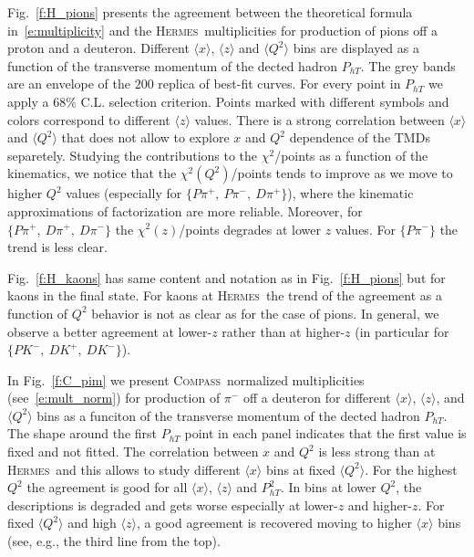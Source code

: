 \documentclass[aps,preprintnumbers,showpacs,nofootinbib,superscriptaddress,floatfix]{revtex4}
\newcommand{\AS}[1]{{\textcolor[rgb]{1,0,1}{#1}}}
\newcommand{\hermes}{\textsc{Hermes}}
\newcommand{\compass}{\textsc{Compass}}
\begin{document}

Fig.~\ref{f:H_pions} presents the agreement between the theoretical formula in~\eqref{e:multiplicity} and the \hermes\ multiplicities for production of pions off a proton and a deuteron. 
Different $\langle x \rangle$, $\langle z \rangle$ and $\langle Q^2 \rangle$ bins are displayed as a \AS{function} of the transverse momentum of the dected hadron $P_{hT}$.
The grey bands are an envelope of the $200$ replica of best-fit curves. For every point in $P_{hT}$ we apply a $68\%$ C.L. selection criterion. 
Points marked with different symbols and colors correspond to different $\langle z \rangle$ values. There is a strong correlation between $\langle x \rangle$ and $\langle Q^2 \rangle$ that does not allow to explore $x$ and $Q^2$ dependence of the TMDs separetely. 
\AS{Studying the contributions to the $\chi^2$/points as a function of the kinematics,  
we notice that the $\chi^2(Q^2)$/points tends to improve as we move to higher $Q^2$ values (especially for $\{ P \pi^+,\ P \pi^-,\ D \pi^+  \}$), where the kinematic approximations of factorization are more reliable. 
Moreover, for $\{ P \pi^+,\ D \pi^+,\ D \pi^-  \}$ the $\chi^2(z)$/points degrades at lower $z$ values. For $\{ P \pi^- \}$ the trend is less clear. }

Fig.~\ref{f:H_kaons} has same content and notation as in Fig.~\ref{f:H_pions} but for kaons in the final state. %
\AS{For kaons at \hermes\ the trend of the agreement as a function of $Q^2$ behavior is not as clear as for the case of pions. 
In general, we observe a better agreement at lower-$z$ rather than at higher-$z$ (in particular for $\{ P K^-,\ D K^+,\ D K^- \}$). }

In Fig.~\ref{f:C_pim} we present \compass\ normalized multiplicities (see~\eqref{e:mult_norm}) for production of $\pi^-$ off a deuteron for different $\langle x \rangle$, $\langle z \rangle$, and $\langle Q^2 \rangle$ bins as a funciton of the transverse momentum of the dected hadron $P_{hT}$. The \AS{shape} around the first $P_{hT}$ point in each panel indicates that the first value is fixed and not fitted. 
The correlation between $x$ and $Q^2$ is less strong than at \hermes\ and this allows to study different $\langle x \rangle$ bins at fixed $\langle Q^2 \rangle$.
For the highest $Q^2$ the agreement is good for all $\langle x \rangle$, $\langle z \rangle$ and $P_{hT}^2$. 
\AS{In bins at lower $Q^2$, the descriptions is degraded and gets worse especially at lower-$z$ and higher-$z$}. 
For fixed $\langle Q^2 \rangle$ and high $\langle z \rangle$, a good agreement is recovered moving to higher $\langle x \rangle$ bins \AS{(see, e.g., the third line from the top)}.
\end{document}
